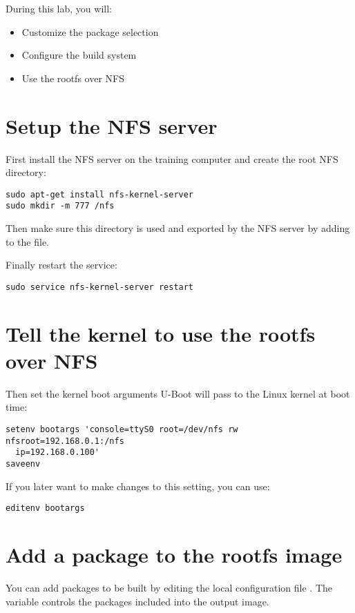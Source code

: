 
During this lab, you will:
\begin{itemize}
  \item Customize the package selection
  \item Configure the build system
  \item Use the rootfs over NFS
\end{itemize}

\section{Setup the NFS server}

First install the NFS server on the training computer and create the root NFS
directory:
\begin{verbatim}
sudo apt-get install nfs-kernel-server
sudo mkdir -m 777 /nfs
\end{verbatim}

Then make sure this directory is used and exported by the NFS server by adding
 to the  file.

Finally restart the service:
\begin{verbatim}
sudo service nfs-kernel-server restart
\end{verbatim}

\section{Tell the kernel to use the rootfs over NFS}

Then set the kernel boot arguments U-Boot will pass to the Linux kernel at boot
time:
\begin{verbatim}
setenv bootargs 'console=ttyS0 root=/dev/nfs rw nfsroot=192.168.0.1:/nfs
  ip=192.168.0.100'
saveenv
\end{verbatim}

If you later want to make changes to this setting, you can use:
\begin{verbatim}
editenv bootargs
\end{verbatim}

\section{Add a package to the rootfs image}

You can add packages to be built by editing the local configuration file
. The  variable controls the
packages included into the output image.

